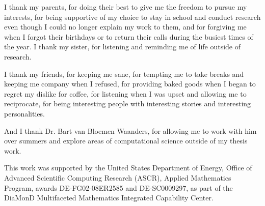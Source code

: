 I thank my parents, for doing their best to give me the freedom to pursue my interests, for being supportive of my choice to stay in school and conduct research even though I could no longer explain my work to them, and for forgiving me when I forgot their birthdays or to return their calls during the busiest times of the year. I thank my sister, for listening and reminding me of life outside of research.

I thank my friends, for keeping me sane, for tempting me to take breaks and keeping me company when I refused, for providing baked goods when I began to regret my dislike for coffee, for listening when I was upset and allowing me to reciprocate, for being interesting people with interesting stories and interesting personalities.

And I thank Dr. Bart van Bloemen Waanders, for allowing me to work with him over summers and explore areas of computational science outside of my thesis work.

This work was supported by the United States Department of Energy, Office of Advanced Scientific Computing Research (ASCR), Applied Mathematics Program, awards DE-FG02-08ER2585 and DE-SC0009297, as part of the DiaMonD Multifaceted Mathematics Integrated Capability Center.
